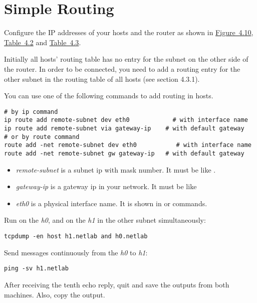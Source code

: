 \documentclass{../UTNetLab}
\begin{document}
\section{Simple Routing}
    Configure the IP addresses of your hosts and the router as shown in \hyperref[fig:4.10]{Figure~4.10}, \hyperref[tab:4.2]{Table~4.2} and \hyperref[tab:4.3]{Table~4.3}.

    Initially all hosts’ routing table has no entry for the subnet on the other side of the router.
    In order to be connected, you need to add a routing entry for the other subnet in the routing table of all hosts (see section 4.3.1).

    You can use one of the following commands to add routing in hosts.
    \begin{lstlisting}[emph={eth0,gateway-ip,remote-subnet},morekeywords={[3]add,dev,via,gw}]
# by ip command
ip route add remote-subnet dev eth0            # with interface name
ip route add remote-subnet via gateway-ip    # with default gateway
# or by route command
route add -net remote-subnet dev eth0           # with interface name
route add -net remote-subnet gw gateway-ip   # with default gateway
    \end{lstlisting}
    \begin{itemize}
        \item \textit{remote-subnet} is a subnet ip with mask number.
                It must be like .
        \item \textit{gateway-ip} is a gateway ip in your network.
                It must be like 
        \item \textit{eth0} is a physical interface name.
                It is shown in  or  commands.
    \end{itemize}
    

    Run  on the \textit{h0}, and  on the \textit{h1} in the other subnet simultaneously:
    \begin{lstlisting}[emph={h0,h1,netlab},morekeywords={[3]host,and}]
tcpdump -en host h1.netlab and h0.netlab
    \end{lstlisting}
    Send  messages continuously from the \textit{h0} to \textit{h1}:
    \begin{lstlisting}[emph={h1, netlab}]
ping -sv h1.netlab
    \end{lstlisting}
    After receiving the tenth echo reply, quit  and save the  outputs from both machines.
    Also, copy the  output.
\end{document}
